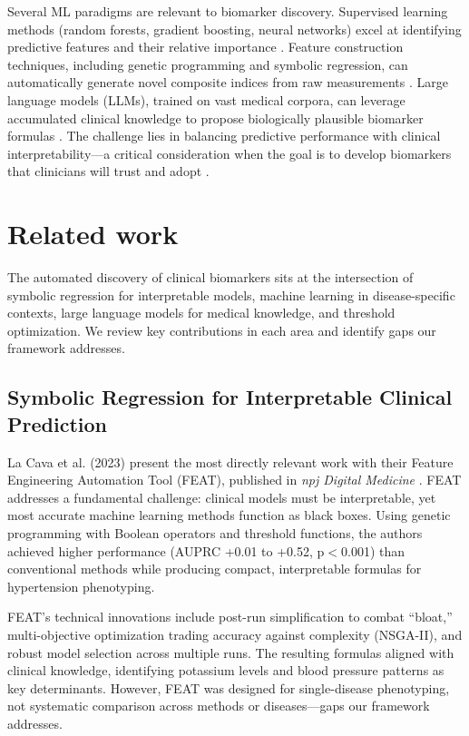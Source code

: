 \documentclass[12pt,a4paper]{article}
\begin{document}
Several ML paradigms are relevant to biomarker discovery. Supervised learning methods (random forests, gradient boosting, neural networks) excel at identifying predictive features and their relative importance \cite{ref22,ref24}. Feature construction techniques, including genetic programming and symbolic regression, can automatically generate novel composite indices from raw measurements \cite{ref12,ref13}. Large language models (LLMs), trained on vast medical corpora, can leverage accumulated clinical knowledge to propose biologically plausible biomarker formulas \cite{ref17,ref18}. The challenge lies in balancing predictive performance with clinical interpretability---a critical consideration when the goal is to develop biomarkers that clinicians will trust and adopt \cite{ref12,ref23}.

\newpage
\section{Related work}

The automated discovery of clinical biomarkers sits at the intersection of symbolic regression for interpretable models, machine learning in disease-specific contexts, large language models for medical knowledge, and threshold optimization. We review key contributions in each area and identify gaps our framework addresses.

\subsection{Symbolic Regression for Interpretable Clinical Prediction}

La Cava et al. (2023) present the most directly relevant work with their Feature Engineering Automation Tool (FEAT), published in \textit{npj Digital Medicine} \cite{ref12}. FEAT addresses a fundamental challenge: clinical models must be interpretable, yet most accurate machine learning methods function as black boxes. Using genetic programming with Boolean operators and threshold functions, the authors achieved higher performance (AUPRC +0.01 to +0.52, p$<$0.001) than conventional methods while producing compact, interpretable formulas for hypertension phenotyping.

FEAT's technical innovations include post-run simplification to combat ``bloat,'' multi-objective optimization trading accuracy against complexity (NSGA-II), and robust model selection across multiple runs. The resulting formulas aligned with clinical knowledge, identifying potassium levels and blood pressure patterns as key determinants. However, FEAT was designed for single-disease phenotyping, not systematic comparison across methods or diseases---gaps our framework addresses.
\end{document}
